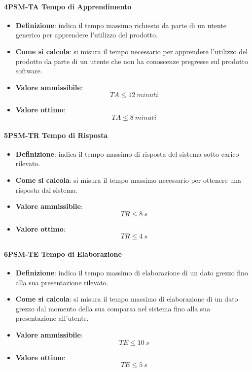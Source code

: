\paragraph*{4PSM-TA Tempo di Apprendimento}
\begin{itemize}
	\item \textbf{Definizione}: indica il tempo massimo richiesto da parte di un utente generico per apprendere l'utilizzo del prodotto.
	\item \textbf{Come si calcola}: si misura il tempo necessario per apprendere l'utilizzo del prodotto da parte di un utente che non ha conoscenze pregresse sul prodotto software.
	\item \textbf{Valore ammissibile}: \begin{equation*}TA \leq 12\ minuti\end{equation*}
	\item \textbf{Valore ottimo}: \begin{equation*}TA \leq 8\ minuti\end{equation*}
\end{itemize}

\paragraph*{5PSM-TR Tempo di Risposta}
\begin{itemize}
	\item \textbf{Definizione}: indica il tempo massimo di risposta del sistema sotto carico rilevato.
	\item \textbf{Come si calcola}: si misura il tempo massimo necessario per ottenere una risposta dal sistema.
	\item \textbf{Valore ammissibile}: \begin{equation*}TR \leq 8\ s\end{equation*}
	\item \textbf{Valore ottimo}: \begin{equation*}TR \leq 4\ s\end{equation*}
\end{itemize}

\paragraph*{6PSM-TE Tempo di Elaborazione}
\begin{itemize}
	\item \textbf{Definizione}: indica il tempo massimo di elaborazione di un dato grezzo fino alla sua presentazione rilevato.
	\item \textbf{Come si calcola}: si misura il tempo massimo di elaborazione di un dato grezzo dal momento della sua comparsa nel sistema fino alla sua presentazione all'utente.
	\item \textbf{Valore ammissibile}: \begin{equation*}TE \leq 10\ s\end{equation*}
	\item \textbf{Valore ottimo}: \begin{equation*}TE \leq 5\ s\end{equation*}
\end{itemize}

